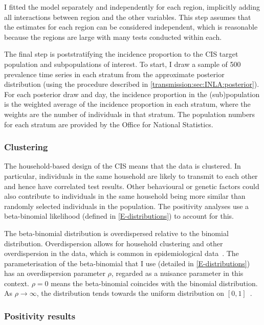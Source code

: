 \documentclass[thesis.tex]{subfiles}
\begin{document}
I fitted the model separately and independently for each region, implicitly adding all interactions between region and the other variables.
This step assumes that the estimates for each region can be considered independent, which is reasonable because the regions are large with many tests conducted within each.

The final step is poststratifying the incidence proportion to the CIS target population and subpopulations of interest.
To start, I draw a sample of 500 prevalence time series in each stratum from the approximate posterior distribution (using the procedure described in \cref{transmission:sec:INLA:posterior}).
For each posterior draw and day, the incidence proportion in the (sub)population is the weighted average of the incidence proportion in each stratum, where the weights are the number of individuals in that stratum.
The population numbers for each stratum are provided by the Office for National Statistics.

\subsubsection{Clustering} \label{biology-data:sec:clustering}

The household-based design of the CIS means that the data is clustered.
In particular, individuals in the same household are likely to transmit to each other and hence have correlated test results.
Other behavioural or genetic factors could also contribute to individuals in the same household being more similar than randomly selected individuals in the population.
The positivity analyses use a beta-binomial likelihood (defined in \cref{E-distributions}) to account for this.

The beta-binomial distribution is overdispersed relative to the binomial distribution.
Overdispersion allows for household clustering and other overdispersion in the data, which is common in epidemiological data~\autocite{griffithsBBD}.
The parameterisation of the beta-binomial that I use (detailed in \cref{E-distributions}) has an overdispersion parameter $\rho$, regarded as a nuisance parameter in this context.
$\rho=0$ means the beta-binomial coincides with the binomial distribution.
As $\rho \to \infty$, the distribution tends towards the uniform distribution on $[0, 1]$~\autocite{hughesUsing}.

\subsubsection{Positivity results} \label{biology-data:sec:positivity-results}
\end{document}
